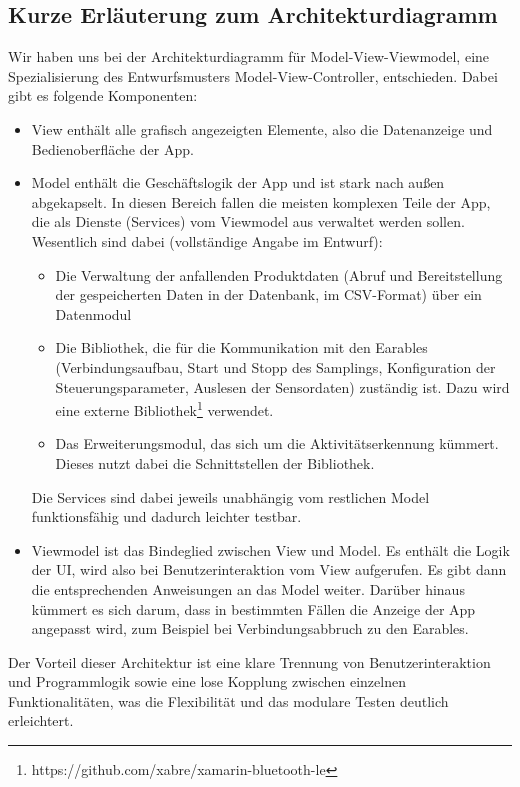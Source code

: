 \documentclass[a4paper,12pt]{article}
\begin{document}
	\subsection{Kurze Erläuterung zum Architekturdiagramm}
  Wir haben uns bei der Architekturdiagramm für \textsf{Model-View-Viewmodel}, eine Spezialisierung  des Entwurfsmusters Model-View-Controller, entschieden.
  Dabei gibt es folgende Komponenten:
  \begin{itemize}
    \item \textsf{\glqq View\grqq{}} enthält alle grafisch angezeigten Elemente, also die Datenanzeige und Bedienoberfläche der App.
    \item {\textsf{\glqq Model\grqq{}} enthält die Geschäftslogik der App und ist stark nach außen abgekapselt. In diesen Bereich fallen die meisten komplexen Teile der App, die als Dienste (Services) vom Viewmodel aus verwaltet werden sollen. Wesentlich sind dabei (vollständige Angabe im Entwurf): \begin{itemize}
      \item Die Verwaltung der anfallenden Produktdaten (Abruf und Bereitstellung der gespeicherten Daten in der Datenbank, im CSV-Format) über ein Datenmodul
      \item Die Bibliothek, die für die Kommunikation mit den \Gls{Earables} (Verbindungsaufbau, Start und Stopp des Samplings, Konfiguration der \Gls{Steuerungsparameter}, Auslesen der Sensordaten) zuständig ist. Dazu wird eine externe Bibliothek\footnote{https://github.com/xabre/xamarin-bluetooth-le} verwendet.
      \item Das Erweiterungsmodul, das sich um die Aktivitätserkennung kümmert. Dieses nutzt dabei die Schnittstellen der Bibliothek.
    \end{itemize}
    Die Services sind dabei jeweils unabhängig vom restlichen Model funktionsfähig und dadurch leichter testbar.}
    \item \textsf{\glqq Viewmodel\grqq{}} ist das Bindeglied zwischen View und Model. Es enthält die Logik der UI, wird also bei Benutzerinteraktion vom View aufgerufen. Es gibt dann die entsprechenden Anweisungen an das Model weiter. Darüber hinaus kümmert es sich darum, dass in bestimmten Fällen die Anzeige der App angepasst wird, zum Beispiel bei Verbindungsabbruch zu den \Gls{Earables}. 
    
  \end{itemize}
  Der Vorteil dieser Architektur ist eine klare Trennung von Benutzerinteraktion und Programmlogik sowie eine lose Kopplung zwischen einzelnen Funktionalitäten, was die Flexibilität und das modulare Testen deutlich erleichtert.
\clearpage
\end{document}
